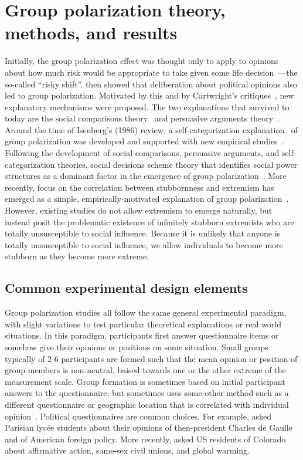 \section{Group polarization theory, methods, and results}

Initially, the group polarization effect was thought only to apply to opinions about how much
risk would be appropriate to take given some life 
decision~\cite{Wallach1965,Teger1967,Stoner1968}---the so-called ``risky shift''. 
 then showed that deliberation about political opinions also led to group 
polarization. Motivated by this and by Cartwright's critiques~\cite{Cartwright1971,Cartwright1973},
new explanatory mechanisms were proposed. The two explanations that survived to today 
are the social comparisons theory~\cite{Brown1974,Sanders1977,Myers1978} 
and persuasive arguments theory~\cite{Burnstein1973,Vinokur1974,Burnstein1975}. 
Around the time of Isenberg's
(1986) review, a self-categorization explanation~\cite{Turner1987} of
group polarization was developed and supported with new empirical 
studies~\cite{Turner1989,Abrams1990,Hogg1990,McGarty1992,Krizan2007}. 
Following the development of social comparisons, persuasive arguments, and
self-categorization theories, 
social decisions scheme theory that identifies social power structures
as a dominant factor in the emergence of group polarization~\cite{Zuber1992,Friedkin1999a}. 
More recently, focus on the correlation between stubbornness and extremism has emerged as
a simple, empirically-motivated explanation of group 
polarization~\cite{Mueller2018,Banisch2019}. However, existing studies do not
allow extremism to emerge naturally, but instead posit the problematic existence of
infinitely stubborn extremists who are totally unsusceptible to social influence.
Because it is unlikely that anyone is totally unsusceptible to social influence,
we allow individuals to become more stubborn as they become more extreme.


\subsection{Common experimental design elements}

Group polarization studies all follow the same general experimental paradigm,
with slight variations to test particular theoretical explanations or 
real world situations. In this paradigm, participants first answer questionnaire
items or somehow give their opinions or positions on some situation. Small groups
typically of 2-6 participants are formed such that the mean opinion or position
of group members is non-neutral, baised towards one or the other extreme of 
the measurement scale. Group formation is sometimes based on initial participant answers to
the questionnaire, but sometimes uses some other method such as a 
different questionnaire \cite{Myers1970} or geographic location that is correlated with individual
opinion~\cite{Schkade2010}. Political questionnaires are common choices.
For example,  asked Parisian lycée students about their 
opinions of then-president Charles de Gaulle and of American foreign policy.
More recently,  asked US residents of Colorado
about affirmative action, same-sex civil unions, and global warming. 

